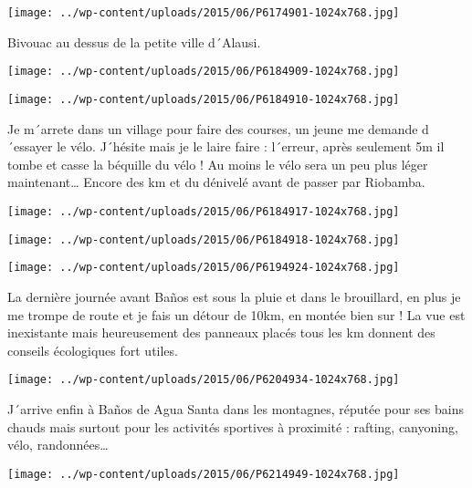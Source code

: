  \newline
\centerline{\texttt{[image: ../wp-content/uploads/2015/06/P6174901-1024x768.jpg]} } 
 \newline
 Bivouac au dessus de la petite ville d´Alausi. \newline
 \newline
\centerline{\texttt{[image: ../wp-content/uploads/2015/06/P6184909-1024x768.jpg]} } 
 \newline
 \newline
\centerline{\texttt{[image: ../wp-content/uploads/2015/06/P6184910-1024x768.jpg]} } 
 \newline
 Je m´arrete dans un village pour faire des courses, un jeune me demande d´essayer le vélo. J´hésite mais je le laire faire : l´erreur, après seulement 5m il tombe et casse la béquille du vélo ! Au moins le vélo sera un peu plus léger maintenant… \newline
 Encore des km et du dénivelé avant de passer par Riobamba. \newline
 \newline
\centerline{\texttt{[image: ../wp-content/uploads/2015/06/P6184917-1024x768.jpg]} } 
 \newline
 \newline
\centerline{\texttt{[image: ../wp-content/uploads/2015/06/P6184918-1024x768.jpg]} } 
 \newline
 \newline
\centerline{\texttt{[image: ../wp-content/uploads/2015/06/P6194924-1024x768.jpg]} } 
 \newline
 La dernière journée avant Baños est sous la pluie et dans le brouillard, en plus je me trompe de route et je fais un détour de 10km, en montée bien sur ! \newline
 La vue est inexistante mais heureusement des panneaux placés tous les km donnent des conseils écologiques fort utiles. \newline
 \newline
\centerline{\texttt{[image: ../wp-content/uploads/2015/06/P6204934-1024x768.jpg]} } 
 \newline
 J´arrive enfin à Baños de Agua Santa dans les montagnes, réputée pour ses bains chauds mais surtout pour les activités sportives à proximité : rafting, canyoning, vélo, randonnées… \newline
 \newline
\centerline{\texttt{[image: ../wp-content/uploads/2015/06/P6214949-1024x768.jpg]} } 
